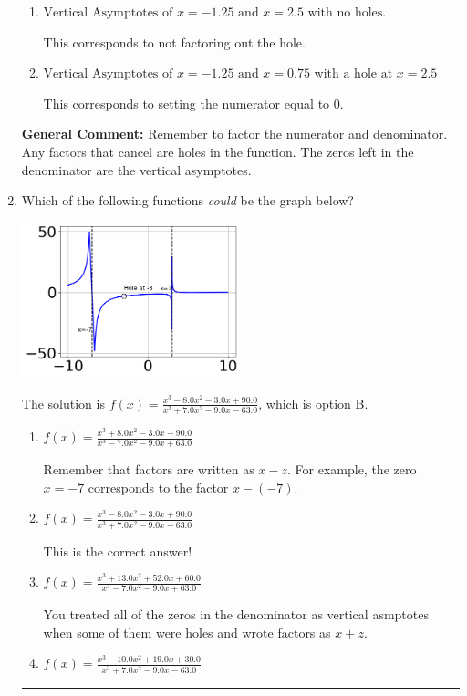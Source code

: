 \documentclass{extbook}[14pt]
\newcommand{\litem}[1]{\item #1

\rule{\textwidth}{0.4pt}}
\begin{document}
\begin{enumerate}
{\begin{enumerate}[label=\Alph*.]
This corresponds to considering where the denominator is equal to 0 as holes.
\item \( \text{Vertical Asymptotes of } x = -1.25 \text{ and } x = 2.5 \text{ with no holes.} \)

This corresponds to not factoring out the hole.
\item \( \text{Vertical Asymptotes of } x = -1.25 \text{ and } x = 0.75 \text{ with a hole at } x = 2.5 \)

This corresponds to setting the numerator equal to 0.
\end{enumerate}

\textbf{General Comment:} Remember to factor the numerator and denominator. Any factors that cancel are holes in the function. The zeros left in the denominator are the vertical asymptotes.
}
\litem{
Which of the following functions \textit{could} be the graph below?

\begin{center}
    \includegraphics[width=0.5\textwidth]{../Figures/identifyGraphOfRationalFunctionCopyA.png}
\end{center}


The solution is \( f(x)=\frac{x^{3} -8.0 x^{2} -3.0 x + 90.0}{x^{3} +7.0 x^{2} -9.0 x -63.0} \), which is option B.\begin{enumerate}[label=\Alph*.]
\item \( f(x)=\frac{x^{3} +8.0 x^{2} -3.0 x -90.0}{x^{3} -7.0 x^{2} -9.0 x + 63.0} \)

Remember that factors are written as $x-z$. For example, the zero $x=-7$ corresponds to the factor $x-(-7)$.
\item \( f(x)=\frac{x^{3} -8.0 x^{2} -3.0 x + 90.0}{x^{3} +7.0 x^{2} -9.0 x -63.0} \)

This is the correct answer!
\item \( f(x)=\frac{x^{3} +13.0 x^{2} +52.0 x + 60.0}{x^{3} -7.0 x^{2} -9.0 x + 63.0} \)

You treated all of the zeros in the denominator as vertical asmptotes when some of them were holes and wrote factors as $x+z$.
\item \( f(x)=\frac{x^{3} -10.0 x^{2} +19.0 x + 30.0}{x^{3} +7.0 x^{2} -9.0 x -63.0} \)


\end{enumerate}}
\end{enumerate}
\end{document}
